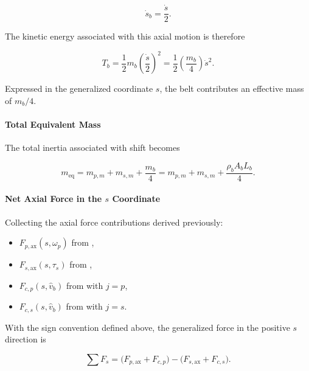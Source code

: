 \documentclass[11pt]{article}
\numberwithin{equation}{section}
\begin{document}
\begin{equation}
\dot s_b = \frac{\dot s}{2}.
\label{eq:belt_half_speed}
\end{equation}

The kinetic energy associated with this axial motion is therefore

\[
T_b
=
\frac12 m_b \left(\frac{\dot s}{2}\right)^2
=
\frac12 \left(\frac{m_b}{4}\right)\dot s^2.
\]

Expressed in the generalized coordinate $s$,
the belt contributes an effective mass of $m_b/4$.

\paragraph{Total Equivalent Mass}

The total inertia associated with shift becomes

\begin{equation}
m_{\mathrm{eq}}
=
m_{p,m} + m_{s,m} + \frac{m_b}{4}
=
m_{p,m} + m_{s,m} + \frac{\rho_b A_b L_b}{4}.
\label{eq:meq_def}
\end{equation}

\paragraph{Net Axial Force in the $s$ Coordinate}

Collecting the axial force contributions derived previously:

\begin{itemize}
  \item $F_{p,\mathrm{ax}}(s,\omega_p)$ from ,
  \item $F_{s,\mathrm{ax}}(s,\tau_s)$ from ,
  \item $F_{c,p}(s,\hat{v}_b)$ from  with $j=p$,
  \item $F_{c,s}(s,\hat{v}_b)$ from  with $j=s$.
\end{itemize}

With the sign convention defined above, the generalized force
in the positive $s$ direction is

\begin{equation}
\sum F_s
=
\Big(F_{p,\mathrm{ax}} + F_{c,p}\Big)
-
\Big(F_{s,\mathrm{ax}} + F_{c,s}\Big).
\label{eq:sumF_shift}
\end{equation}
\end{document}
